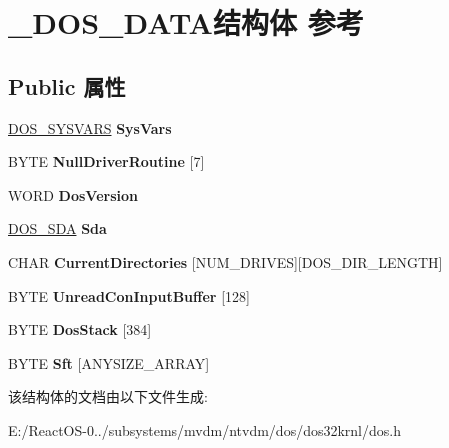 \hypertarget{struct___d_o_s___d_a_t_a}{}\section{\+\_\+\+D\+O\+S\+\_\+\+D\+A\+T\+A结构体 参考}
\label{struct___d_o_s___d_a_t_a}
\subsection*{Public 属性}
\begin{DoxyCompactItemize}
\item 
\mbox{\label{struct___d_o_s___d_a_t_a_a0e06e947ff34fc6047c1971bbc6f550f}} 
\hyperlink{struct___d_o_s___s_y_s_v_a_r_s}{D\+O\+S\+\_\+\+S\+Y\+S\+V\+A\+RS} {\bfseries Sys\+Vars}
\item 
\mbox{\label{struct___d_o_s___d_a_t_a_ac83d66080a6820cfea3487e38ab1e2b3}} 
B\+Y\+TE {\bfseries Null\+Driver\+Routine} \mbox{[}7\mbox{]}
\item 
\mbox{\label{struct___d_o_s___d_a_t_a_a2912e6a54cab5b8273edfdffb652ca96}} 
W\+O\+RD {\bfseries Dos\+Version}
\item 
\mbox{\label{struct___d_o_s___d_a_t_a_a1430d6376d10d6e85411316af4b5c37b}} 
\hyperlink{struct___d_o_s___s_d_a}{D\+O\+S\+\_\+\+S\+DA} {\bfseries Sda}
\item 
\mbox{\label{struct___d_o_s___d_a_t_a_ab464f3f2c473d2dba6e5c49b590f2a1d}} 
C\+H\+AR {\bfseries Current\+Directories} \mbox{[}N\+U\+M\+\_\+\+D\+R\+I\+V\+ES\mbox{]}\mbox{[}D\+O\+S\+\_\+\+D\+I\+R\+\_\+\+L\+E\+N\+G\+TH\mbox{]}
\item 
\mbox{\label{struct___d_o_s___d_a_t_a_abcce7f899a638f2040edff695b281ccf}} 
B\+Y\+TE {\bfseries Unread\+Con\+Input\+Buffer} \mbox{[}128\mbox{]}
\item 
\mbox{\label{struct___d_o_s___d_a_t_a_aa6b00e1ffb5d9f3a918e28599fcf571b}} 
B\+Y\+TE {\bfseries Dos\+Stack} \mbox{[}384\mbox{]}
\item 
\mbox{\label{struct___d_o_s___d_a_t_a_ab5a4f741139b59a6614183fe1570cbc5}} 
B\+Y\+TE {\bfseries Sft} \mbox{[}A\+N\+Y\+S\+I\+Z\+E\+\_\+\+A\+R\+R\+AY\mbox{]}
\end{DoxyCompactItemize}


该结构体的文档由以下文件生成\+:\begin{DoxyCompactItemize}
\item 
E\+:/\+React\+O\+S-\/0../subsystems/mvdm/ntvdm/dos/dos32krnl/dos.\+h\end{DoxyCompactItemize}
